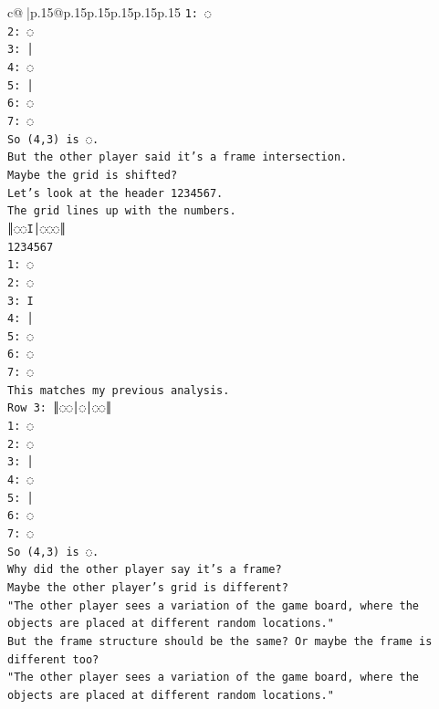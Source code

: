 \documentclass{article}
\begin{document}
{\begin{supertabular}{c@{$\;$}|p{.15\linewidth}@{}p{.15\linewidth}p{.15\linewidth}p{.15\linewidth}p{.15\linewidth}p{.15\linewidth}}
{{{\texttt{1: ◌} \\
\texttt{2: ◌} \\
\texttt{3: │} \\
\texttt{4: ◌} \\
\texttt{5: │} \\
\texttt{6: ◌} \\
\texttt{7: ◌} \\
\texttt{So (4,3) is ◌.} \\
\texttt{But the other player said it's a frame intersection.} \\
\texttt{Maybe the grid is shifted?} \\
\texttt{Let's look at the header  1234567.} \\
\texttt{The grid lines up with the numbers.} \\
\texttt{║◌◌I│◌◌◌║} \\
\texttt{1234567} \\
\texttt{1: ◌} \\
\texttt{2: ◌} \\
\texttt{3: I} \\
\texttt{4: │} \\
\texttt{5: ◌} \\
\texttt{6: ◌} \\
\texttt{7: ◌} \\
\texttt{This matches my previous analysis.} \\
\texttt{Row 3: ║◌◌│◌│◌◌║} \\
\texttt{1: ◌} \\
\texttt{2: ◌} \\
\texttt{3: │} \\
\texttt{4: ◌} \\
\texttt{5: │} \\
\texttt{6: ◌} \\
\texttt{7: ◌} \\
\texttt{So (4,3) is ◌.} \\
\texttt{Why did the other player say it's a frame?} \\
\texttt{Maybe the other player's grid is different?} \\
\texttt{"The other player sees a variation of the game board, where the objects are placed at different random locations."} \\
\texttt{But the frame structure should be the same? Or maybe the frame is different too?} \\
\texttt{"The other player sees a variation of the game board, where the objects are placed at different random locations."} \\
}}}
\end{supertabular}}
\end{document}
